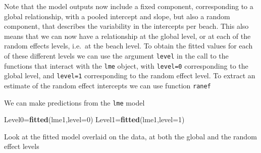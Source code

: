 \documentclass[
]{book}
\newenvironment{Shaded}{\begin{snugshade}}{\end{snugshade}}
\newcommand{\AttributeTok}[1]{\textcolor[rgb]{0.13,0.29,0.53}{#1}}
\newcommand{\CommentTok}[1]{\textcolor[rgb]{0.56,0.35,0.01}{\textit{#1}}}
\newcommand{\ControlFlowTok}[1]{\textcolor[rgb]{0.13,0.29,0.53}{\textbf{#1}}}
\newcommand{\DecValTok}[1]{\textcolor[rgb]{0.00,0.00,0.81}{#1}}
\newcommand{\FunctionTok}[1]{\textcolor[rgb]{0.13,0.29,0.53}{\textbf{#1}}}
\newcommand{\NormalTok}[1]{#1}
\newcommand{\OtherTok}[1]{\textcolor[rgb]{0.56,0.35,0.01}{#1}}
\newcommand{\SpecialCharTok}[1]{\textcolor[rgb]{0.81,0.36,0.00}{\textbf{#1}}}
\begin{document}
Note that the model outputs now include a fixed component, corresponding to a global relationship, with a pooled intercept and slope, but also a random component, that describes the variability in the intercepts per beach. This also means that we can now have a relationship at the global level, or at each of the random effects levels, i.e.~at the beach level. To obtain the fitted values for each of these different levels we can use the argument \texttt{level} in the call to the functions that interact with the \texttt{lme} object, with \texttt{level=0} corresponding to the global level, and \texttt{level=1} corresponding to the random effect level. To extract an estimate of the random effect intercepts we can use function \texttt{ranef}

We can make predictions from the \texttt{lme} model

\begin{Shaded}
\begin{Highlighting}[]
\NormalTok{Level0}\OtherTok{=}\FunctionTok{fitted}\NormalTok{(lme1,}\AttributeTok{level=}\DecValTok{0}\NormalTok{)}
\NormalTok{Level1}\OtherTok{=}\FunctionTok{fitted}\NormalTok{(lme1,}\AttributeTok{level=}\DecValTok{1}\NormalTok{)}
\end{Highlighting}
\end{Shaded}

Look at the fitted model overlaid on the data, at both the global and the random effect levels

\begin{Shaded}
\end{Shaded}
\end{document}
